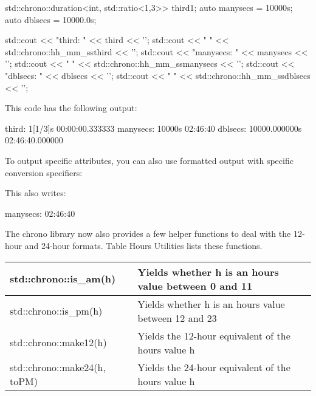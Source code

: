 \begin{cpp}
std::chrono::duration<int, std::ratio<1,3>> third{1};
auto manysecs = 10000s;
auto dblsecs = 10000.0s;

std::cout << "third: " << third << '\n';
std::cout << " " << std::chrono::hh_mm_ss{third} << '\n';
std::cout << "manysecs: " << manysecs << '\n';
std::cout << " " << std::chrono::hh_mm_ss{manysecs} << '\n';
std::cout << "dblsecs: " << dblsecs << '\n';
std::cout << " " << std::chrono::hh_mm_ss{dblsecs} << '\n';
\end{cpp}

This code has the following output:

\begin{shell}
third:    1[1/3]s
          00:00:00.333333
manysecs: 10000s
          02:46:40
dblsecs:  10000.000000s
          02:46:40.000000
\end{shell}

To output specific attributes, you can also use formatted output with specific conversion specifiers:


This also writes:

\begin{shell}
manysecs: 02:46:40
\end{shell}


The chrono library now also provides a few helper functions to deal with the 12-hour and 24-hour formats. Table Hours Utilities lists these functions.

\begin{longtable}[c]{|l|l|}
\hline
std::chrono::is\_am(h)       & Yields whether h is an hours value between 0 and 11  \\ \hline
\endfirsthead
%
\endhead
%
std::chrono::is\_pm(h)       & Yields whether h is an hours value between 12 and 23 \\ \hline
std::chrono::make12(h)       & Yields the 12-hour equivalent of the hours value h   \\ \hline
std::chrono::make24(h, toPM) & Yields the 24-hour equivalent of the hours value h   \\ \hline
\end{longtable}

